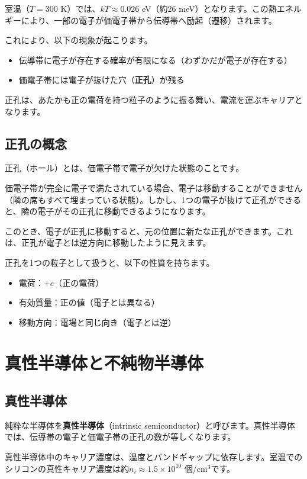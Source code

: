 室温（$T = 300$ K）では、$kT \approx 0.026$ eV（約26 meV）となります。この熱エネルギーにより、一部の電子が価電子帯から伝導帯へ励起（遷移）されます。

これにより、以下の現象が起こります。
\begin{itemize}
\item 伝導帯に電子が存在する確率が有限になる（わずかだが電子が存在する）
\item 価電子帯には電子が抜けた穴（\textbf{正孔}）が残る
\end{itemize}

正孔は、あたかも正の電荷を持つ粒子のように振る舞い、電流を運ぶキャリアとなります。

\subsection{正孔の概念}

正孔（ホール）とは、価電子帯で電子が欠けた状態のことです。

価電子帯が完全に電子で満たされている場合、電子は移動することができません（隣の席もすべて埋まっている状態）。しかし、1つの電子が抜けて正孔ができると、隣の電子がその正孔に移動できるようになります。

このとき、電子が正孔に移動すると、元の位置に新たな正孔ができます。これは、正孔が電子とは逆方向に移動したように見えます。

正孔を1つの粒子として扱うと、以下の性質を持ちます。
\begin{itemize}
\item 電荷：$+e$（正の電荷）
\item 有効質量：正の値（電子とは異なる）
\item 移動方向：電場と同じ向き（電子とは逆）
\end{itemize}


\section{真性半導体と不純物半導体}

\subsection{真性半導体}

純粋な半導体を\textbf{真性半導体}（intrinsic semiconductor）と呼びます。真性半導体では、伝導帯の電子と価電子帯の正孔の数が等しくなります。

真性半導体中のキャリア濃度は、温度とバンドギャップに依存します。室温でのシリコンの真性キャリア濃度は約$n_i \approx 1.5 \times 10^{10}$ 個/cm$^3$です。

